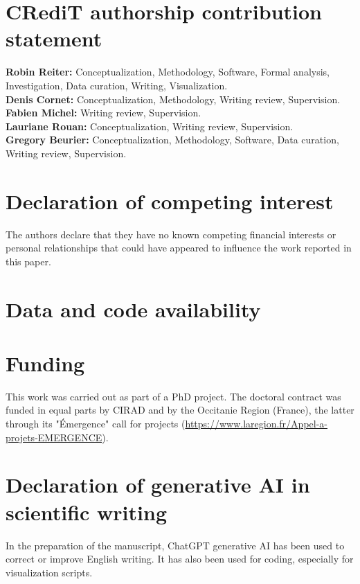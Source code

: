 \documentclass{article}
\begin{document}
\section*{CRediT authorship contribution statement}
\textbf{Robin Reiter:} Conceptualization, Methodology, Software, Formal analysis, Investigation, Data curation, Writing, Visualization.\\
\textbf{Denis Cornet:} Conceptualization, Methodology, Writing review, Supervision.\\
\textbf{Fabien Michel:} Writing review, Supervision.\\
\textbf{Lauriane Rouan:} Conceptualization, Writing review, Supervision.\\
\textbf{Gregory Beurier:} Conceptualization, Methodology, Software, Data curation, Writing review, Supervision.

\section*{Declaration of competing interest}
The authors declare that they have no known competing financial interests or personal relationships that could have appeared to influence the work reported in this paper.

\section*{Data and code availability}

\section*{Funding}
This work was carried out as part of a PhD project. The doctoral contract was funded in equal parts by CIRAD and by the Occitanie Region (France), the latter through its "Émergence" call for projects (\url{https://www.laregion.fr/Appel-a-projets-EMERGENCE}).

\section*{Declaration of generative AI in scientific writing}
In the preparation of the manuscript, ChatGPT generative AI has been used to correct or improve English writing. It has also been used for coding, especially for visualization scripts.
\end{document}
